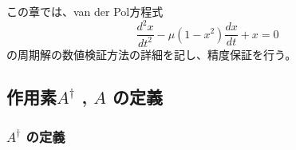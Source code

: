 

%
この章では、van der Pol方程式
$$
\frac{d^2 x}{dt^2} - \mu (1-x^2)\frac{dx}{dt} + x = 0
$$
の周期解の数値検証方法の詳細を記し、精度保証を行う。

\subsection{作用素$A^\dagger$ , $A$ の定義}

\subsubsection{$A^\dagger$ の定義}

